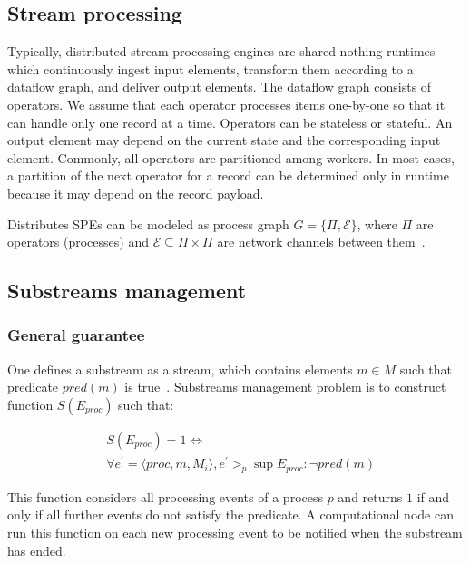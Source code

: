 \label{fs-acker-preliminaries}

\subsection{Stream processing}

Typically, distributed stream processing engines are shared-nothing runtimes which continuously ingest input elements, transform them according to a dataflow graph, and deliver output elements. The dataflow graph consists of operators. We assume that each operator processes items one-by-one so that it can handle only one record at a time. Operators can be stateless or stateful. An output element may depend on the current state and the corresponding input element. Commonly, all operators are partitioned among workers. In most cases, a partition of the next operator for a record can be determined only in runtime because it may depend on the record payload. 

Distributes SPEs can be modeled as process graph $G=\{\Pi,\mathcal{E}\}$, where $\Pi$ are operators (processes) and $\mathcal{E} \subseteq \Pi \times \Pi$ are network channels between them~\cite{carbone2018scalable}. 

\subsection{Substreams management}

\subsubsection{General guarantee}

One defines a substream as a stream, which contains elements $m \in M$ such that predicate $pred(m)$ is true~\cite{Tucker:2003:EPS:776752.776780}. Substreams management problem is to construct function $S(E_{proc})$ such that:

\begin{align*}
& S(E_{proc}) = 1 \Longleftrightarrow \\ 
& \forall e^{'} = \langle proc,m,M_i\rangle, e^{'} >_p \sup E_{proc} : \neg pred(m)
\end{align*}

This function considers all processing events of a process $p$ and returns $1$ if and only if all further events do not satisfy the predicate. A computational node can run this function on each new processing event to be notified when the substream has ended.

